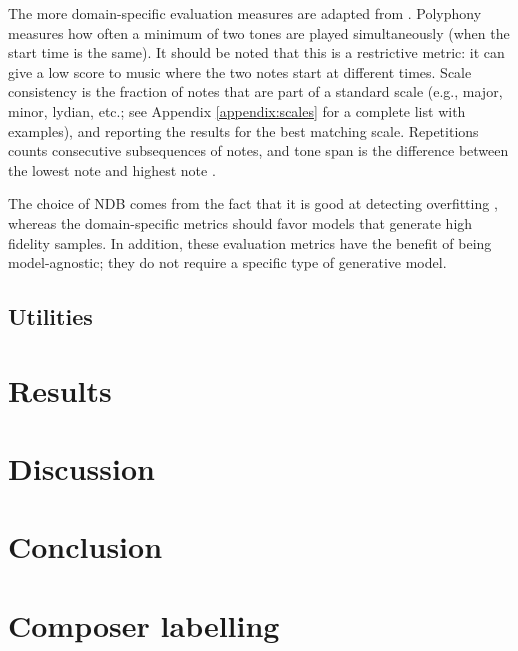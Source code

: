\documentclass[a4paper]{book}
\begin{document}
The more domain-specific evaluation measures are adapted from \textcite{mogren_c-rnn-gan_2016}. Polyphony measures how often a minimum of two tones are played simultaneously (when the start time is the same). It should be noted that this is a restrictive metric: it can give a low score to music where the two notes start at different times. Scale consistency is the fraction of notes that are part of a standard scale (e.g., major, minor, lydian, etc.; see Appendix \ref{appendix:scales} for a complete list with examples), and reporting the results for the best matching scale. Repetitions counts consecutive subsequences of notes, and tone span is the difference between the lowest note and highest note \parencite[counted in semi-tones;][]{mogren_c-rnn-gan_2016}.

The choice of NDB comes from the fact that it is good at detecting overfitting \parencite{borji_pros_2018}, whereas the domain-specific metrics should favor models that generate high fidelity samples. In addition, these evaluation metrics have the benefit of being model-agnostic; they do not require a specific type of generative model.

\section{Utilities}

\chapter{Results}\label{chap:results}

\chapter{Discussion}\label{chap:discussion}

\chapter{Conclusion}\label{chap:conclusion}

\printbibliography

\appendix

\chapter{Composer labelling} \label{appendix:labelling}
\end{document}
